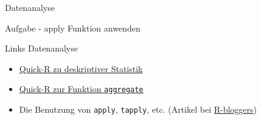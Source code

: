 \documentclass[ignorenonframetext,]{beamer}
\begin{document}
\begin{frame}[fragile]{Datenanalyse}
\begin{block}{Aufgabe - apply Funktion anwenden}
\end{block}

\begin{block}{Links Datenanalyse}

\begin{itemize}
\item
  \href{http://www.statmethods.net/stats/descriptives.html}{Quick-R zu
  deskriptiver Statistik}
\item
  \href{http://www.statmethods.net/management/aggregate.html}{Quick-R
  zur Funktion \texttt{aggregate}}
\item
  Die Benutzung von \texttt{apply}, \texttt{tapply}, etc. (Artikel bei
  \href{http://www.r-bloggers.com/using-apply-sapply-lapply-in-r/}{R-bloggers})
\end{itemize}

\end{block}

\end{frame}
\end{document}
